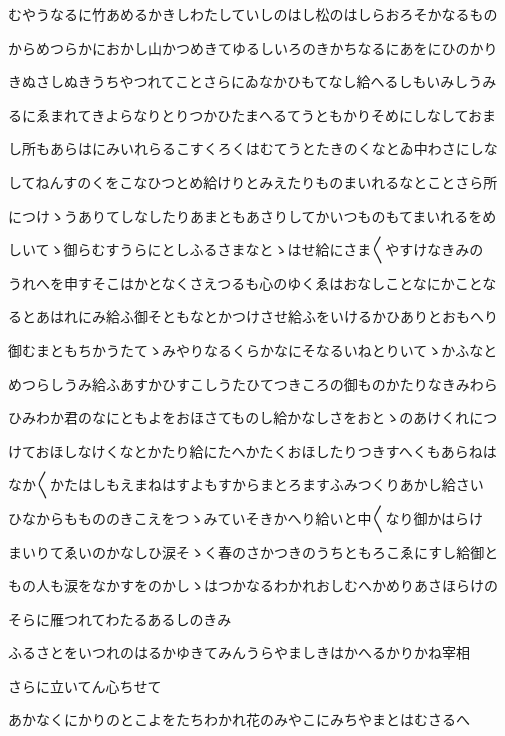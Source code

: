 \documentclass[a4paper,11pt,landscape]{ltjtarticle}
\begin{document}
\par\medskip
むやうなるに竹あめるかきしわたしていしのはし松のはしらおろそかなるもの
\par\medskip
からめつらかにおかし山かつめきてゆるしいろのきかちなるにあをにひのかり
\par\medskip
きぬさしぬきうちやつれてことさらにゐなかひもてなし給へるしもいみしうみ
\par\medskip
るにゑまれてきよらなりとりつかひたまへるてうともかりそめにしなしておま
\par\medskip
し所もあらはにみいれらるこすくろくはむてうとたきのくなとゐ中わさにしな
\par\medskip
してねんすのくをこなひつとめ給けりとみえたりものまいれるなとことさら所
\par\medskip
につけゝうありてしなしたりあまともあさりしてかいつものもてまいれるをめ
\par\medskip
しいてゝ御らむすうらにとしふるさまなとゝはせ給にさま〱やすけなきみの
\par\medskip
うれへを申すそこはかとなくさえつるも心のゆくゑはおなしことなにかことな
\par\medskip
るとあはれにみ給ふ御そともなとかつけさせ給ふをいけるかひありとおもへり
\par\medskip
御むまともちかうたてゝみやりなるくらかなにそなるいねとりいてゝかふなと
\par\medskip
めつらしうみ給ふあすかひすこしうたひてつきころの御ものかたりなきみわら
\par\medskip
ひみわか君のなにともよをおほさてものし給かなしさをおとゝのあけくれにつ
\par\medskip
けておほしなけくなとかたり給にたへかたくおほしたりつきすへくもあらねは
\par\medskip
なか〱かたはしもえまねはすよもすからまとろますふみつくりあかし給さい
\par\medskip
ひなからももののきこえをつゝみていそきかへり給いと中〱なり御かはらけ
\par\medskip
まいりてゑいのかなしひ涙そゝく春のさかつきのうちともろこゑにすし給御と
\par\medskip
もの人も涙をなかすをのかしゝはつかなるわかれおしむへかめりあさほらけの
\par\medskip
そらに雁つれてわたるあるしのきみ
\par\medskip
ふるさとをいつれのはるかゆきてみんうらやましきはかへるかりかね宰相
\par\medskip
さらに立いてん心ちせて
\par\medskip
あかなくにかりのとこよをたちわかれ花のみやこにみちやまとはむさるへ
\end{document}
